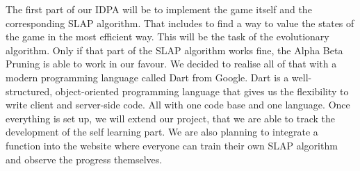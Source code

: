 The first part of our IDPA will be to implement the game itself and the corresponding SLAP algorithm. 
That includes to find a way to value the states of the game in the most efficient way. This will be the task of the evolutionary algorithm. Only if that part of the SLAP algorithm works fine, the Alpha Beta Pruning is able to work in our favour.
We decided to realise all of that with a modern programming language called Dart from Google. Dart is a well-structured, object-oriented programming language that gives us the flexibility to write client and server-side code. All with one code base and one language. Once everything is set up, we will extend our project, that we are able to track the development of the self learning part. We are also planning to integrate a function into the website where everyone can train their own SLAP algorithm and observe the progress themselves. 



